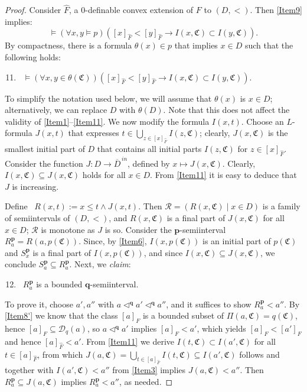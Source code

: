 \documentclass{amsart}
\theoremstyle{definition}
\theoremstyle{definition}
\newcommand{\Mon}{\mathfrak C}
\begin{document}
\begin{proof}
Consider $\hat F$, a $0$-definable convex extension of $F$ to $(D,<)$. Then \ref{Item9} implies:
\[ \models (\forall x,y\models p)([x]_{\hat F}<[y]_{\hat F}\rightarrow I(x,\Mon)\subset I(y,\Mon)).\]
By compactness, there is a formula $\theta(x)\in p$ that implies $x\in D$ such that the following holds:
\begin{enumerate}[(1)]
\setcounter{enumi}{10}
\item\label{Item11}  \ $\models (\forall x,y\in \theta(\Mon))([x]_{\hat F}<[y]_{\hat F}\rightarrow I(x,\Mon)\subset I(y,\Mon)).$
\end{enumerate}
To simplify the notation used below, we will assume that $\theta(x)$ is $x\in D$; alternatively, we can replace $D$ with $\theta(D)$. Note that this does not affect the validity of \ref{Item1}--\ref{Item11}. We now modify the formula $I(x,t)$. Choose an $L$-formula $J(x,t)$ that expresses $t\in \bigcup_{z\in [x]_{\hat F}}I(z,\Mon)$; clearly, $J(x,\Mon)$ is the smallest initial part of $D$ that contains all initial parts $I(z,\Mon)$ for $z\in [x]_{\hat F}$. Consider the function $J:D\to \overline{D}^{\,in}$, defined by $x\mapsto J(x,\Mon)$. Clearly, $I(x,\Mon)\subseteq J(x,\Mon)$ holds for all $x\in D$. From \ref{Item11} it is easy to deduce that $J$ is increasing. 

Define \ $R(x,t):=x\leqslant t\land J(x,t)$. Then $\mathcal R=(R(x,\Mon)\mid x\in D)$ is a family of semiintervals of $(D,<)$, and 
$R(x,\Mon)$ is a final part of $J(x,\Mon)$ for all $x\in D$; $\mathcal R$ is monotone as $J$ is so. 
Consider the $\mathbf p$-semiinterval $R^{\mathbf p}_a=R(a,p(\Mon))$.
Since, by \ref{Item6}, $I(x,p(\Mon))$ is an initial part of $p(\Mon)$ and $S^{\mathbf p}_x$ is a final part of $I(x,p(\Mon))$, and since $I(x,\Mon)\subseteq J(x,\Mon)$, we conclude $S^{\mathbf p}_a\subseteq R^{\mathbf p}_a$. Next, we {\em claim}: 
\begin{enumerate}[\hspace{10pt}(1)]
\setcounter{enumi}{11}
\item\label{Item12}  \  $R^{\mathbf p}_a$ is a bounded $\mathbf q$-semiinterval. 
\end{enumerate}
To prove it, choose $a',a''$ with $a\triangleleft^{\mathbf q}a'\triangleleft^{\mathbf q}a''$, and it suffices to show $R^{\mathbf p}_a< a''$.
By \ref{Item8'} we know that the class $[a]_F$ is a bounded subset of $\Pi(a,\Mon)=q(\Mon)$, hence $[a]_F\subseteq \mathcal D_q(a)$, so $a\triangleleft^{\mathbf q}a'$ implies $[a]_F<a'$, which yields $[a]_F<[a']_F$ and hence $[a]_{\hat F}<a'$. From \ref{Item11} we derive $I(t,\Mon)\subset I(a',\Mon)$ for all $t\in [a]_{\hat F}$, from which $J(a,\Mon)=\bigcup_{t\in[a]_{\hat F}}I(t,\Mon)\subseteq I(a',\Mon)$ follows and together with $I(a',\Mon)<a''$ from \ref{Item3} implies $J(a,\Mon)<a''$. Then $R^{\mathbf p}_a\subseteq J(a,\Mon)$ implies $R^{\mathbf p}_a<a''$, as needed.


\end{proof}
\end{document}
